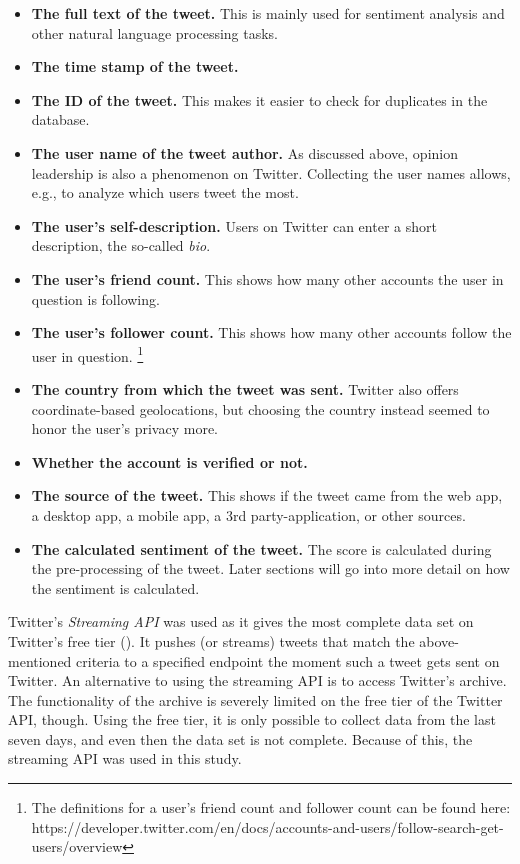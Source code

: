 \begin{itemize}
\item \textbf{The full text of the tweet.} This is mainly used for sentiment analysis and other natural language processing tasks.
\item \textbf{The time stamp of the tweet.}
\item \textbf{The ID of the tweet.} This makes it easier to check for duplicates in the database. 
\item \textbf{The user name of the tweet author.} As discussed above, opinion leadership is also a phenomenon on Twitter. Collecting the user names allows, e.g., to analyze which users tweet the most.
\item \textbf{The user's self-description.} Users on Twitter can enter a short description, the so-called \emph{bio}.
\item \textbf{The user's friend count.} This shows how many other accounts the user in question is following.
\item \textbf{The user's follower count.} This shows how many other accounts follow the user in question. \footnote{The definitions for a user's friend count and follower count can be found here: https://developer.twitter.com/en/docs/accounts-and-users/follow-search-get-users/overview}
\item \textbf{The country from which the tweet was sent.} Twitter also offers coordinate-based geolocations, but choosing the country instead seemed to honor the user's privacy more.
\item \textbf{Whether the account is verified or not.}
\item \textbf{The source of the tweet.} This shows if the tweet came from the web app, a desktop app, a mobile app, a 3rd party-application, or other sources.
\item \textbf{The calculated sentiment of the tweet.} The score is calculated during the pre-processing of the tweet. Later sections will go into more detail on how the sentiment is calculated.
\end{itemize}


Twitter's \emph{Streaming API} was used as it gives the most complete data set on Twitter's free tier (\cite{brunsTwitterDataWhat2014}). It pushes (or streams) tweets that match the above-mentioned criteria to a specified endpoint the moment such a tweet gets sent on Twitter. An alternative to using the streaming API is to access Twitter's archive. The functionality of the archive is severely limited on the free tier of the Twitter API, though. Using the free tier, it is only possible to collect data from the last seven days, and even then the data set is not complete. Because of this, the streaming API was used in this study.

